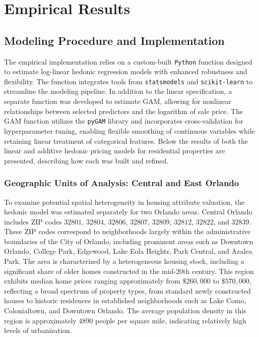 \section*{Empirical Results}

\subsection*{Modeling Procedure and Implementation}
The empirical implementation relies on a custom-built \texttt{Python} function designed to estimate log-linear hedonic regression models with enhanced robustness and flexibility. The function integrates tools from \texttt{statsmodels} and \texttt{scikit-learn} to streamline the modeling pipeline. In addition to the linear specification, a separate function was developed to estimate GAM, allowing for nonlinear relationships between selected predictors and the logarithm of sale price. The GAM function utilizes the \texttt{pyGAM} library and incorporates cross-validation for hyperparameter tuning, enabling flexible smoothing of continuous variables while retaining linear treatment of categorical features. Below the results of both the linear and additive hedonic pricing models for residential properties are presented, describing how each was built and refined.


\subsubsection*{Geographic Units of Analysis: Central and East Orlando}
To examine potential spatial heterogeneity in housing attribute valuation, the hedonic model was estimated separately for two Orlando areas. Central Orlando includes ZIP codes $32801$, $32804$, $32806$, $32807$, $32809$, $32812$, $32822$, and $32839$. These ZIP codes correspond to neighborhoods largely within the administrative boundaries of the City of Orlando, including prominent areas such as Downtown Orlando, College Park, Edgewood, Lake Eola Heights, Park Central, and Azalea Park. The area is characterized by a heterogeneous housing stock, including a significant share of older homes constructed in the mid-20th century. This region exhibits median home prices ranging approximately from $\$260,000$ to $\$570,000$, reflecting a broad spectrum of property types, from standard newly constructed houses to historic residences in established neighborhoods such as Lake Como, Colonialtown, and Downtown Orlando. The average population density in this region is approximately 4890 people per square mile, indicating relatively high levels of urbanization.


